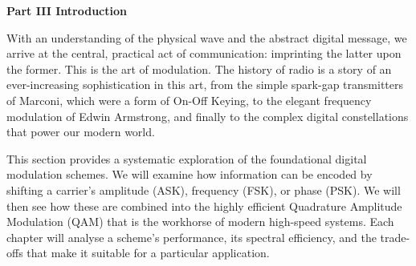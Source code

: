 \newpage
\thispagestyle{empty}

\vspace*{3cm}

\begin{center}
{\Large\lorettadisplay\bfseries Part III Introduction}
\end{center}

\vspace{2cm}

With an understanding of the physical wave and the abstract digital message, we arrive at the central, practical act of communication: imprinting the latter upon the former. This is the art of modulation. The history of radio is a story of an ever-increasing sophistication in this art, from the simple spark-gap transmitters of Marconi, which were a form of On-Off Keying, to the elegant frequency modulation of Edwin Armstrong, and finally to the complex digital constellations that power our modern world.

\vspace{1em}

This section provides a systematic exploration of the foundational digital modulation schemes. We will examine how information can be encoded by shifting a carrier's amplitude (ASK), frequency (FSK), or phase (PSK). We will then see how these are combined into the highly efficient Quadrature Amplitude Modulation (QAM) that is the workhorse of modern high-speed systems. Each chapter will analyse a scheme's performance, its spectral efficiency, and the trade-offs that make it suitable for a particular application.

\vspace*{\fill}
\newpage
